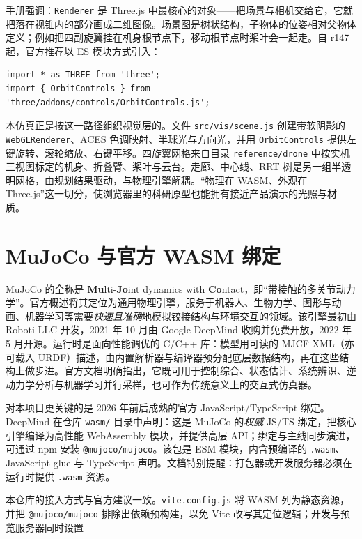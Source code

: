 \documentclass[UTF8,a4paper,11pt,zihao=-4]{ctexart}
\begin{document}
手册强调：\texttt{Renderer} 是 Three.js 中最核心的对象——把场景与相机交给它，它就把落在视锥内的部分画成二维图像。场景图是树状结构，子物体的位姿相对父物体定义；例如把四副旋翼挂在机身根节点下，移动根节点时桨叶会一起走。自 r147 起，官方推荐以 ES 模块方式引入：

\begin{lstlisting}[language=JS]
import * as THREE from 'three';
import { OrbitControls } from 'three/addons/controls/OrbitControls.js';
\end{lstlisting}

本仿真正是按这一路径组织视觉层的。文件 \texttt{src/vis/scene.js} 创建带软阴影的 \texttt{WebGLRenderer}、ACES 色调映射、半球光与方向光，并用 \texttt{OrbitControls} 提供左键旋转、滚轮缩放、右键平移。四旋翼网格来自目录 \texttt{reference/drone} 中按实机三视图标定的机身、折叠臂、桨叶与云台。走廊、中心线、RRT 树是另一组半透明网格，由规划结果驱动，与物理引擎解耦。``物理在 WASM、外观在 Three.js''这一切分，使浏览器里的科研原型也能拥有接近产品演示的光照与材质。

\section{MuJoCo 与官方 WASM 绑定}
\label{sec:mujoco}

MuJoCo 的全称是 \textbf{Mu}lti-\textbf{Jo}int dynamics with \textbf{Co}ntact，即``带接触的多关节动力学''。官方概述\cite{mujoco}将其定位为通用物理引擎，服务于机器人、生物力学、图形与动画、机器学习等需要\emph{快速且准确}地模拟铰接结构与环境交互的领域。该引擎最初由 Roboti LLC 开发，2021 年 10 月由 Google DeepMind 收购并免费开放，2022 年 5 月开源。运行时是面向性能调优的 C/C++ 库：模型用可读的 MJCF XML（亦可载入 URDF）描述，由内置解析器与编译器预分配底层数据结构，再在这些结构上做步进。官方文档明确指出，它既可用于控制综合、状态估计、系统辨识、逆动力学分析与机器学习并行采样，也可作为传统意义上的交互式仿真器。

对本项目更关键的是 2026 年前后成熟的官方 JavaScript/TypeScript 绑定\cite{mujoco-wasm}。DeepMind 在仓库 \texttt{wasm/} 目录中声明：这是 MuJoCo 的\emph{权威} JS/TS 绑定，把核心引擎编译为高性能 WebAssembly 模块，并提供高层 API；绑定与主线同步演进，可通过 npm 安装 \texttt{@mujoco/mujoco}。该包是 ESM 模块，内含预编译的 \texttt{.wasm}、JavaScript glue 与 TypeScript 声明。文档特别提醒：打包器或开发服务器必须在运行时提供 \texttt{.wasm} 资源。

本仓库的接入方式与官方建议一致。\texttt{vite.config.js} 将 WASM 列为静态资源，并把 \texttt{@mujoco/mujoco} 排除出依赖预构建，以免 Vite 改写其定位逻辑；开发与预览服务器同时设置
\end{document}

